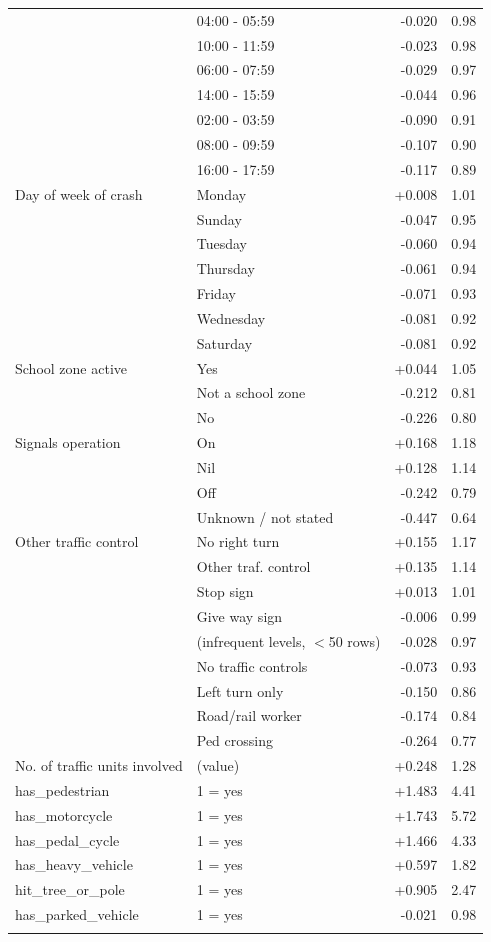 \documentclass[11pt,a4paper]{article}
\begin{document}
{\begin{longtable}{@{}p{3.6cm}p{6.6cm}rr@{}}
 & 04:00 - 05:59 & -0.020 & 0.98 \\
 & 10:00 - 11:59 & -0.023 & 0.98 \\
 & 06:00 - 07:59 & -0.029 & 0.97 \\
 & 14:00 - 15:59 & -0.044 & 0.96 \\
 & 02:00 - 03:59 & -0.090 & 0.91 \\
 & 08:00 - 09:59 & -0.107 & 0.90 \\
 & 16:00 - 17:59 & -0.117 & 0.89 \\
\addlinespace[2pt]
Day of week of crash & Monday & +0.008 & 1.01 \\
 & Sunday & -0.047 & 0.95 \\
 & Tuesday & -0.060 & 0.94 \\
 & Thursday & -0.061 & 0.94 \\
 & Friday & -0.071 & 0.93 \\
 & Wednesday & -0.081 & 0.92 \\
 & Saturday & -0.081 & 0.92 \\
\addlinespace[2pt]
School zone active & Yes & +0.044 & 1.05 \\
 & Not a school zone & -0.212 & 0.81 \\
 & No & -0.226 & 0.80 \\
\addlinespace[2pt]
Signals operation & On & +0.168 & 1.18 \\
 & Nil & +0.128 & 1.14 \\
 & Off & -0.242 & 0.79 \\
 & Unknown / not stated & -0.447 & 0.64 \\
\addlinespace[2pt]
Other traffic control & No right turn & +0.155 & 1.17 \\
 & Other traf. control & +0.135 & 1.14 \\
 & Stop sign & +0.013 & 1.01 \\
 & Give way sign & -0.006 & 0.99 \\
 & (infrequent levels, $<$50 rows) & -0.028 & 0.97 \\
 & No traffic controls & -0.073 & 0.93 \\
 & Left turn only & -0.150 & 0.86 \\
 & Road/rail worker & -0.174 & 0.84 \\
 & Ped crossing & -0.264 & 0.77 \\
\addlinespace[2pt]
No. of traffic units involved & (value) & +0.248 & 1.28 \\
\addlinespace[2pt]
has\_pedestrian & 1 = yes & +1.483 & 4.41 \\
\addlinespace[2pt]
has\_motorcycle & 1 = yes & +1.743 & 5.72 \\
\addlinespace[2pt]
has\_pedal\_cycle & 1 = yes & +1.466 & 4.33 \\
\addlinespace[2pt]
has\_heavy\_vehicle & 1 = yes & +0.597 & 1.82 \\
\addlinespace[2pt]
hit\_tree\_or\_pole & 1 = yes & +0.905 & 2.47 \\
\addlinespace[2pt]
has\_parked\_vehicle & 1 = yes & -0.021 & 0.98 \\
\addlinespace[2pt]
\end{longtable}
}
\end{document}
